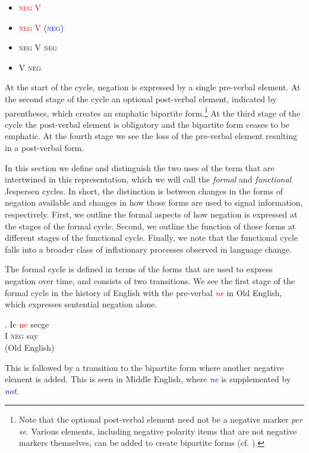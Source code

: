 \documentclass[linguex]{sp}
\theoremstyle{definition} \newtheorem{definition}{Definition}
\begin{document}
\begin{itemize}
    \item [1.] \textsc{\textcolor{red}{neg V}}
    \item [2.]  \textsc{\textcolor{red}{neg V} \textcolor{blue}{(neg)}}
    \item [3.] \textsc{\color{blue} neg V neg}
    \item [4.] \textsc{\color{green} V neg}
\end{itemize}
At the start of the cycle, negation is expressed by a single pre-verbal element. At the second stage of the cycle an optional post-verbal element, indicated by parentheses, which creates an emphatic bipartite form.\footnote{Note that the optional post-verbal element need not be a negative marker \emph{per se}. Various elements, including negative polarity items that are not negative markers themselves, can be added to create bipartite forms (cf. \citealt{horn:1989,givon1978, croft1991}).} At the third stage of the cycle the post-verbal element is obligatory and the bipartite form ceases to be emphatic. At the fourth stage we see the loss of the pre-verbal element resulting in a post-verbal form.

In this section we define and distinguish the two uses of the term that are intertwined in this representation, which we will call the \emph{formal} and \emph{functional} Jespersen cycles. In short, the distinction is between changes in the forms of negation available and changes in how those forms are used to signal information, respectively.  First, we outline the formal aspects of how negation is expressed at the stages of the formal cycle. Second, we outline the function of those forms at different stages of the functional cycle. Finally, we note that the functional cycle falls into a broader class of inflationary processes observed in language change.

The formal cycle is defined in terms of the forms that are used to express negation over time, and consists of two transitions. We see the first stage of the formal cycle in the history of English with the pre-verbal \emph{\textcolor{red}{ne}} in Old English, which expresses sentential negation alone.

\exg. Ic \textcolor{red}{ne} secge\\
      I \textsc{neg} say\\
      (Old English)

This is followed by a transition to the bipartite form where another negative element is added. This is seen in Middle English, where \emph{\textcolor{blue}{ne}} is supplemented by \emph{\textcolor{blue}{not}}.
\end{document}
